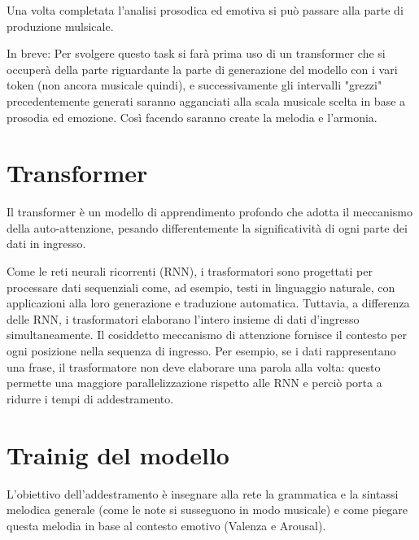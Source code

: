 Una volta completata l'analisi prosodica ed emotiva si può passare alla parte di produzione mulsicale.

In breve: Per svolgere questo task si farà prima uso di un transformer che si occuperà della parte riguardante la parte di generazione del modello con i vari token (non ancora musicale quindi), e successivamente gli intervalli "grezzi" precedentemente generati saranno agganciati alla scala musicale scelta in base a prosodia ed emozione.
Così facendo saranno create la melodia e l'armonia.



\section{Transformer}
Il transformer è un modello di apprendimento profondo che adotta il meccanismo della auto-attenzione, pesando differentemente la significatività di ogni parte dei dati in ingresso.


Come le reti neurali ricorrenti (RNN), i trasformatori sono progettati per processare dati sequenziali come, ad esempio, testi in linguaggio naturale, con applicazioni alla loro generazione e traduzione automatica. Tuttavia, a differenza delle RNN, i trasformatori elaborano l'intero insieme di dati d'ingresso simultaneamente. Il cosiddetto meccanismo di attenzione fornisce il contesto per ogni posizione nella sequenza di ingresso. Per esempio, se i dati rappresentano una frase, il trasformatore non deve elaborare una parola alla volta: questo permette una maggiore parallelizzazione rispetto alle RNN e perciò porta a ridurre i tempi di addestramento.




\section{Trainig del modello}
L'obiettivo dell'addestramento è insegnare alla rete la grammatica e la sintassi melodica generale (come le note si susseguono in modo musicale) e come piegare questa melodia in base al contesto emotivo (Valenza e Arousal).

